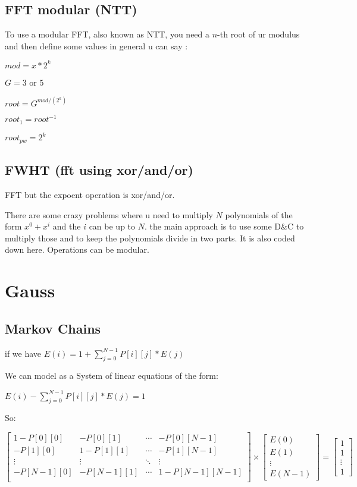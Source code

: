     \subsection{FFT modular (NTT)}
    To use a modular FFT, also known as NTT, you need a $n$-th root of ur modulus and then define some values in general u can say :
    
    $mod = x*2^k$
    
    $G = 3 $ or $5$
    
    $root = G^{mod/(2^k)}$
    
    $root_1 = root^{-1}$
    
    $root_{pw} = 2^k$
    

    \subsection{FWHT (fft using xor/and/or)}
    FFT but the expoent operation is xor/and/or.

    There are some crazy problems where u need to multiply $N$ polynomials of the form $x^0 + x^i$ and the $i$ can be up to $N$. the main approach is to use some D\&C to multiply those and to keep the polynomials divide in two parts. It is also coded down here. Operations can be modular.
    
    \section{Gauss}
    \subsection{Markov Chains}
    if we have $E(i) = 1 + \sum_{j=0}^{N-1} P[i][j] * E(j)$

    We can model as a System of linear equations of the form:

    $E(i) - \sum_{j=0}^{N-1} P[i][j] * E(j) = 1$

    So:

    \[ \begin{bmatrix}
         1-P[0][0] & -P[0][1] & \cdots & -P[0][N-1]\\
         -P[1][0] & 1-P[1][1] & \cdots & -P[1][N-1]\\
         \vdots & \vdots & \ddots & \vdots\\ 
         -P[N-1][0] & -P[N-1][1] & \cdots & 1-P[N-1][N-1]\\
     \end{bmatrix}
     \times
     \begin{bmatrix}
         E(0)\\
         E(1)\\ 
         \vdots\\ 
         E(N-1) 
     \end{bmatrix}
      =
     \begin{bmatrix}
         1\\
         1\\ 
         \vdots\\ 
         1 
     \end{bmatrix} \]



